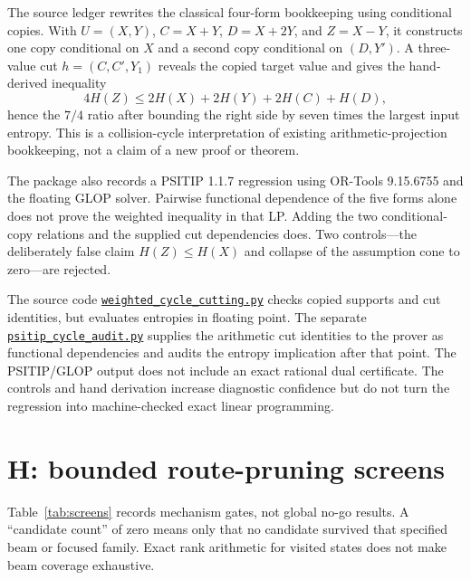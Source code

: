 \documentclass[11pt]{article}
\newcommand{\assetpath}{../assets/yuanjiang_kakeya_recollision_assets_2026-08-11/unpacked/}
\begin{document}
The source ledger rewrites the classical four-form bookkeeping using conditional copies. With $U=(X,Y)$, $C=X+Y$, $D=X+2Y$, and $Z=X-Y$, it constructs one copy conditional on $X$ and a second copy conditional on $(D,Y')$. A three-value cut $h=(C,C',Y_1)$ reveals the copied target value and gives the hand-derived inequality
\[
 4H(Z)\le 2H(X)+2H(Y)+2H(C)+H(D),
\]
hence the $7/4$ ratio after bounding the right side by seven times the largest input entropy. This is a collision-cycle interpretation of existing arithmetic-projection bookkeeping, not a claim of a new proof or theorem.

The package also records a PSITIP 1.1.7 regression using OR-Tools 9.15.6755 and the floating GLOP solver. Pairwise functional dependence of the five forms alone does not prove the weighted inequality in that LP. Adding the two conditional-copy relations and the supplied cut dependencies does. Two controls---the deliberately false claim $H(Z)\le H(X)$ and collapse of the assumption cone to zero---are rejected.

The source code
\href{\assetpath weighted_cycle_cutting.py}{\texttt{weighted\_cycle\_cutting.py}}
checks copied supports and cut identities, but evaluates entropies in floating point. The separate
\href{\assetpath psitip_cycle_audit.py}{\texttt{psitip\_cycle\_audit.py}}
supplies the arithmetic cut identities to the prover as functional dependencies and audits the entropy implication after that point. The PSITIP/GLOP output does not include an exact rational dual certificate. The controls and hand derivation increase diagnostic confidence but do not turn the regression into machine-checked exact linear programming.

\section{H: bounded route-pruning screens}
\label{sec:screens}

Table~\ref{tab:screens} records mechanism gates, not global no-go results. A ``candidate count'' of zero means only that no candidate survived that specified beam or focused family. Exact rank arithmetic for visited states does not make beam coverage exhaustive.
\end{document}
